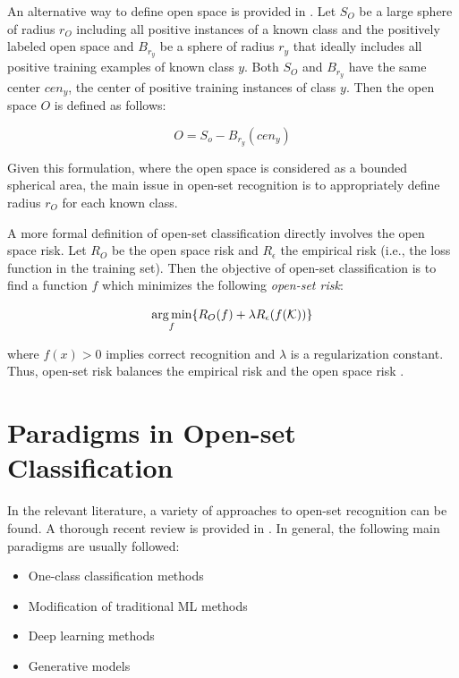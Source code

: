 An alternative way to define open space is provided in  \parencite{fei2016breaking}. Let $S_O$ be a large sphere of radius $r_O$ including all positive instances of a known class and the positively labeled open space and $B_{r_y}$ be a sphere of radius $r_y$ that ideally includes all positive training examples of known class $y$. Both $S_O$ and $B_{r_y}$ have the same center $cen_y$, the center of positive training instances of class $y$. Then the open space $O$ is defined as follows:

\begin{equation}\label{chap:eval_methods:eq:openspace_spherical_constrained}
	O = S_{o} - B_{r_{y}}(cen_{y})
\end{equation}

Given this formulation, where the open space is considered as a bounded spherical area, the main issue in open-set recognition is to appropriately define radius $r_O$ for each known class.

A more formal definition of open-set classification directly involves the open space risk. Let $R_{O}$ be the open space risk and $R_{\epsilon}$ the empirical risk (i.e., the loss function in the training set). Then the objective of open-set classification is to find a function $f$ which minimizes the following \textit{open-set risk}: 

\begin{equation}
\label{eq:open_space_risk}
\operatorname*{arg\,min}_{f} \{R_{O}(f ) + \lambda R_{\epsilon}(f (\mathcal{K}))\}
\end{equation}

\noindent where $f (x) > 0$ implies correct recognition and $\lambda$ is a regularization constant. Thus, open-set risk balances the empirical risk and the open space risk \parencite{geng2018recent}. 

\section{Paradigms in Open-set Classification}
\label{chap:openset:sec:Open_Set_Classification_Paradigms}

In the relevant literature, a variety of approaches to open-set recognition can be found. A thorough recent review is provided in \parencite{geng2018recent}. In general, the following main paradigms are usually followed:

\begin{itemize}
    \item One-class classification methods
    \item Modification of traditional ML methods
    \item Deep learning methods
    \item Generative models
\end{itemize}

